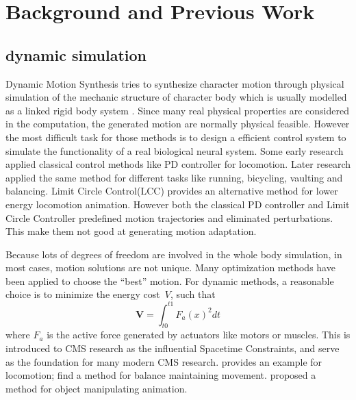 \section{Background and Previous Work}
\subsection{dynamic simulation}
Dynamic Motion Synthesis  tries to synthesize character motion through physical simulation of the mechanic structure of character body which is usually modelled as a linked rigid body system \cite{Baraff1994,Mirtich1996,Stewart2000}. Since many real physical properties are considered in the computation, the generated motion are normally physical feasible. However the most difficult task for those methods is to design a efficient control system to simulate the functionality of a real biological neural system. Some early research applied classical control methods like PD controller \cite{Raibert1991} for locomotion. Later research \cite{Hodgins1995} applied the same method for different tasks like running, bicycling, vaulting and balancing. Limit Circle Control(LCC) \cite{Laszlo1996} provides an alternative method for lower energy locomotion animation. However both the classical PD controller and Limit Circle Controller predefined motion trajectories and eliminated perturbations. This make them not good at generating motion adaptation.

Because lots of degrees of freedom are involved in the whole body simulation, in most cases, motion solutions are not unique. Many optimization methods have been applied to choose the ``best'' motion. For dynamic methods, a reasonable choice is to minimize the energy cost~$V$, such that 
\[
\textbf{V}=\int_{t0}^{t1}F_{a}(x)^2dt
\]
where $F_{a}$ is the active force generated by actuators like motors or muscles. This is introduced to CMS research as the influential Spacetime Constraints\cite{Witkin1988}, and serve as the foundation for many modern CMS research. \cite{Jain2009} provides an example for locomotion;  \cite{BalanceControl} find a method for balance maintaining movement. \cite{Liu2009} proposed a method for object manipulating animation.

